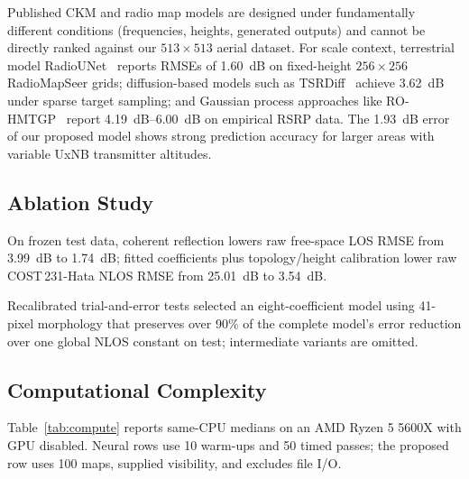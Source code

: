 \documentclass[10pt,conference,letterpaper]{IEEEtran}
\begin{document}
Published CKM and radio map models are designed under fundamentally different conditions (frequencies, heights, generated outputs) and cannot be directly ranked against our $513 \times 513$ aerial dataset. For scale context, terrestrial model RadioUNet~\cite{radiounet2020} reports RMSEs of \SI{1.60}{dB} on fixed-height $256 \times 256$ RadioMapSeer grids; diffusion-based models such as TSRDiff~\cite{tsrdiff2025} achieve \SI{3.62}{dB} under sparse target sampling; and Gaussian process approaches like RO-HMTGP~\cite{rohmtgp2025} report \SI{4.19}{dB}--\SI{6.00}{dB} on empirical RSRP data. The \SI{1.93}{dB} error of our proposed model shows strong prediction accuracy for larger areas with variable UxNB transmitter altitudes.

\subsection{Ablation Study}
On frozen test data, coherent reflection lowers raw free-space LOS RMSE from \SI{3.99}{dB} to \SI{1.74}{dB}; fitted coefficients plus topology/height calibration lower raw COST\,231-Hata NLOS RMSE from \SI{25.01}{dB} to \SI{3.54}{dB}.

Recalibrated trial-and-error tests selected an eight-coefficient model using 41-pixel morphology that preserves over 90\% of the complete model's error reduction over one global NLOS constant on test; intermediate variants are omitted.


\subsection{Computational Complexity}
Table~\ref{tab:compute} reports same-CPU medians on an AMD Ryzen 5 5600X with GPU disabled. Neural rows use 10 warm-ups and 50 timed passes; the proposed row uses 100 maps, supplied visibility, and excludes file I/O.
\end{document}

